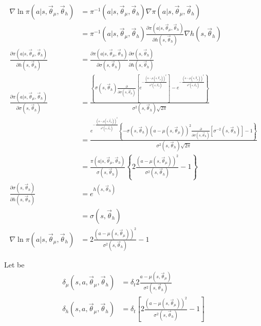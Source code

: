 \documentclass[]{article}
\begin{document}
\begin{align*}
	\nabla \ln \pi(a|s,\vec \theta_\mu, \vec \theta_h )
	& = \pi^{-1}(a|s,\vec \theta_\mu, \vec \theta_h ) \nabla \pi(a|s,\vec \theta_\mu, \vec \theta_h)
	\\
	& = \pi^{-1}(a|s,\vec \theta_\mu, \vec \theta_h )
	\frac{\partial \pi(a|s,\vec \theta_\mu, \vec \theta_h )}{\partial h(s, \vec \theta_h)} \nabla h(s, \vec \theta_h)
	\\	
	\frac{\partial \pi(a|s,\vec \theta_\mu, \vec \theta_h )}{\partial h(s, \vec \theta_h)}
	&= \frac{\partial \pi(a|s,\vec \theta_\mu, \vec \theta_h )}{\partial \sigma(s, \vec \theta_h)}
 	\frac{\partial \sigma(s, \vec \theta_h)}{\partial h(s, \vec \theta_h)}
	\\
	\frac{\partial \pi(a|s,\vec \theta_\mu, \vec \theta_h )}{\partial \sigma(s, \vec \theta_h)}
	& = \frac{
	\left\{
		\sigma(s,\vec \theta_h) \frac{\partial}{\partial \sigma(s,\vec \theta_h)}
		\left[
			e^{-\frac{(a-\mu(s, \vec \theta_\mu))^2}{\sigma^2(s,\vec \theta_h)}}
		\right]
		- e^{-\frac{(a-\mu(s, \vec \theta_\mu))^2}{\sigma^2(s, \vec \theta_h)}}
	\right\}}{\sigma^2(s,\vec \theta_h) \sqrt{2 \pi}}	
	\\
	& = \frac{
	e^{-\frac{(a-\mu(s, \vec \theta_\mu))^2}{\sigma^2(s,\vec \theta_h)}}
	\left\{
		-\sigma(s,\vec \theta_h)
		(a-\mu(s,\vec \theta_\mu))^2
		\frac{\partial}{\partial \sigma(s,\vec \theta_h)}
		\left[
			\sigma^{-2}(s,\vec \theta_h)
		\right]
		- 1
	\right\} }{\sigma^2(s,\vec \theta_h) \sqrt{2 \pi}}	
	\\
	& = \frac{\pi(a|s,\vec \theta_\mu, \vec \theta_h)}{\sigma(s,\vec \theta_h)}
	\left\{
		2 \frac{(a-\mu(s,\vec \theta_\mu))^2} {\sigma^2(s,\vec \theta_h)} - 1
	\right\}
	\\
	\frac{\partial \sigma(s,\vec \theta_h)}{\partial h(s,\vec \theta_h)}
	&= e^{h(s, \vec \theta_h)}
	\\
	&= \sigma(s, \vec \theta_h)
	\\
	\nabla \ln \pi(a|s,\vec \theta_\mu, \vec \theta_h )
	& = 2 \frac{(a-\mu(s,\vec \theta_\mu))^2} {\sigma^2(s,\vec \theta_h)} - 1
\end{align*}

Let be
\begin{align*}
	\delta_\mu(s, a, \vec \theta_\mu, \vec \theta_h )
	&= \delta_t 2 \frac{a - \mu(s, \vec \theta_\mu)}{\sigma^2(s, \vec \theta_h)}
	\\
	\delta_h(s, a, \vec \theta_\mu, \vec \theta_h )
	&= \delta_t 
	\left[
		2 \frac{(a-\mu(s,\vec \theta_\mu))^2} {\sigma^2(s,\vec \theta_h)} - 1
	\right]
\end{align*}
\end{document}
